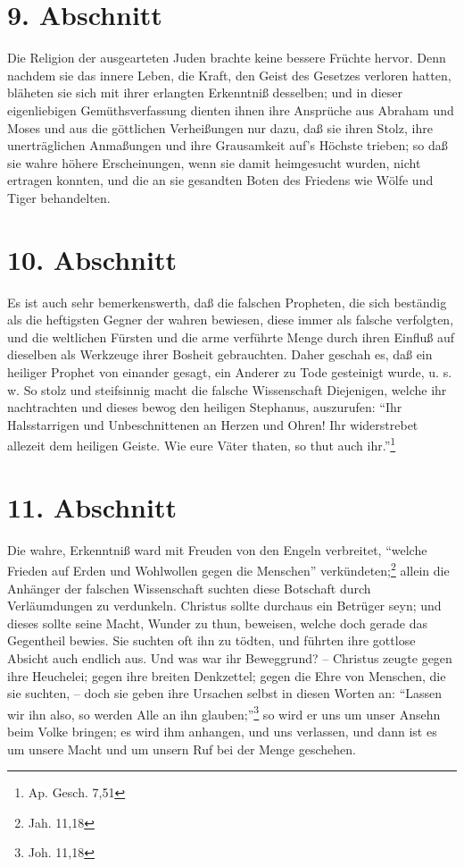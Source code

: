 \section{9. Abschnitt} \label{kap7_ab9}

Die Religion der ausgearteten Juden brachte keine bessere Früchte hervor. Denn
nachdem sie das innere Leben, die Kraft, den Geist des Gesetzes verloren hatten,
bläheten sie sich mit ihrer erlangten Erkenntniß desselben; und in dieser
eigenliebigen Gemüthsverfassung dienten ihnen ihre Ansprüche aus Abraham und
Moses und aus die göttlichen Verheißungen nur dazu, daß sie ihren Stolz, ihre
unerträglichen Anmaßungen und ihre Grausamkeit auf's Höchste trieben; so daß sie
wahre höhere Erscheinungen, wenn sie damit heimgesucht wurden, nicht ertragen
konnten, und die an sie gesandten Boten des Friedens wie Wölfe und Tiger
behandelten.

\section{10. Abschnitt} \label{kap7_ab10}

Es ist auch sehr bemerkenswerth, daß die falschen Propheten, die sich beständig
als die heftigsten Gegner der wahren bewiesen, diese immer als falsche
verfolgten, und die weltlichen Fürsten und die arme verführte Menge durch ihren
Einfluß auf dieselben als Werkzeuge ihrer Bosheit gebrauchten. Daher geschah es,
daß ein heiliger Prophet von einander gesagt, ein Anderer zu Tode gesteinigt
wurde, u. s. w. So stolz und steifsinnig macht die falsche Wissenschaft
Diejenigen, welche ihr nachtrachten und dieses bewog den heiligen Stephanus,
auszurufen: "`Ihr Halsstarrigen und Unbeschnittenen an Herzen und Ohren! Ihr
widerstrebet allezeit dem heiligen Geiste. Wie eure Väter thaten, so thut auch
ihr."'\footnote{Ap. Gesch. 7,51}

\section{11. Abschnitt} \label{kap7_ab11}

Die wahre, Erkenntniß ward mit Freuden von den Engeln verbreitet,  "`welche
Frieden auf Erden und Wohlwollen gegen die Menschen"'
verkündeten;\footnote{Jah. 11,18} allein die Anhänger der falschen Wissenschaft
suchten diese Botschaft durch Verläumdungen zu verdunkeln. Christus sollte
durchaus ein Betrüger seyn; und dieses sollte seine Macht, Wunder zu thun,
beweisen, welche doch gerade das Gegentheil bewies. Sie suchten oft ihn zu
tödten, und führten ihre gottlose Absicht auch endlich aus. Und was war ihr
Beweggrund? -- Christus zeugte gegen ihre Heuchelei; gegen ihre breiten
Denkzettel; gegen die Ehre von Menschen, die sie suchten, -- doch sie geben ihre
Ursachen selbst in diesen Worten an: "`Lassen wir ihn also, so werden Alle an
ihn glauben;"'\footnote{Joh. 11,18} so wird er uns um unser Ansehn beim Volke
bringen; es wird ihm anhangen, und uns verlassen, und dann ist es um unsere
Macht und um unsern Ruf bei der Menge geschehen.

